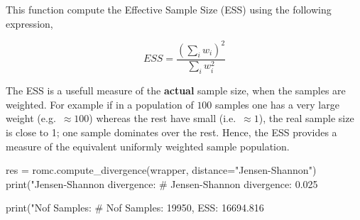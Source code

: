 \noindent
This function compute the Effective Sample Size (ESS) using the following expression,

\begin{equation} \label{eq:ESS}
  ESS = \frac{(\sum_i w_i)^2}{\sum_i w_i^2}
\end{equation}

The ESS is a usefull measure of the \textbf{actual} sample size, when
the samples are weighted. For example if in a population of $100$
samples one has a very large weight (e.g.\ $\approx 100$) whereas the
rest have small (i.e.\ $\approx 1$), the real sample size is close to
1; one sample dominates over the rest. Hence, the ESS provides a
measure of the equivalent uniformly weighted sample population.

\begin{pythoncode}
res = romc.compute_divergence(wrapper, distance="Jensen-Shannon")                                 
print("Jensen-Shannon divergence: %
# Jensen-Shannon divergence: 0.025

print("Nof Samples: %
# Nof Samples: 19950, ESS: 16694.816
\end{pythoncode}